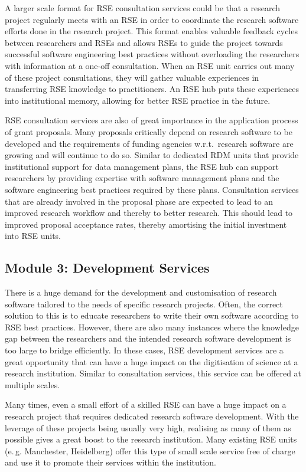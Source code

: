 \documentclass[a4paper]{article}
\makeatletter
\newcommand*{\eg}{e.\,g.\@\xspace}
\makeatother
\begin{document}
A larger scale format for RSE consultation services could be that a research project regularly meets with an RSE in order to coordinate the research software efforts done in the research project.
This format enables valuable feedback cycles between researchers and RSEs and allows RSEs to guide the project
towards successful software engineering best practices without overloading the researchers with information at a one-off consultation.
When an RSE unit carries out many of these project consultations, they will gather valuable experiences in transferring RSE knowledge to practitioners.
An RSE hub puts these experiences into institutional memory, allowing for better RSE practice in the future.

RSE consultation services are also of great importance in the application process of grant proposals.
Many proposals critically depend on research software to be developed and the requirements of funding agencies w.r.t.\ research software are growing and will continue to do so.
Similar to dedicated RDM units that provide institutional support for data management plans,
the RSE hub can support researchers by providing expertise with software management plans and the software engineering best practices required by these plans.
Consultation services that are already involved in the proposal phase are expected to lead to an improved research workflow and thereby to better research.
This should lead to improved proposal acceptance rates, thereby amortising the initial investment into RSE units.


\subsection{Module 3: Development Services}%
\label{sec:development}

There is a huge demand for the development and customisation of research software tailored to the needs of specific research projects.
Often, the correct solution to this is to educate researchers to write their own software according to RSE best practices.
However, there are also many instances where the knowledge gap between the researchers and the intended research software development is too large to bridge efficiently.
In these cases, RSE development services are a great opportunity that can have a huge impact on the digitisation of science at a research institution.
Similar to consultation services, this service can be offered at multiple scales.

Many times, even a small effort of a skilled RSE can have a huge impact on a research project that requires dedicated research software development.
With the leverage of these projects being usually very high, realising as many of them as possible gives a great boost to the research institution.
Many existing RSE units (\eg{} Manchester, Heidelberg) offer this type of small scale service free of charge and use it to promote their services within the institution.
\end{document}
